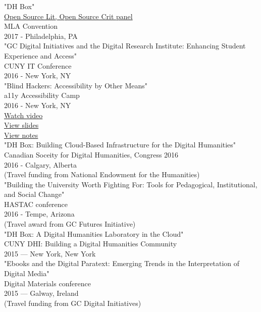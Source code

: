 \documentclass[11pt]{article}
\begin{document}
"DH Box"\\
\href{https://text.mla.hcommons.org/}{Open Source Lit, Open Source Crit panel}\\
MLA Convention\\
2017 - Philadelphia, PA\\

"GC Digital Initiatives and the Digital Research Institute: Enhancing Student Experience and Access"\\
CUNY IT Conference\\
2016 - New York, NY\\

"Blind Hackers: Accessibility by Other Means"\\
a11y Accessibility Camp\\
2016 - New York, NY\\
\href{https://www.youtube.com/watch?v=W8_O3joo4aU}{Watch video}\\
\href{http://htmlpreview.github.io/?https://github.com/smythp/blind-hackers/blob/master/presentation/foo.html}{View slides}\\
\href{https://github.com/smythp/blind-hackers}{View notes}\\

"DH Box: Building Cloud-Based Infrastructure for the Digital Humanities"\\
Canadian Soceity for Digital Humanities, Congress 2016\\
2016 - Calgary, Alberta\\
(Travel funding from National Endowment for the Humanities)\\

"Building the University Worth Fighting For: Tools for Pedagogical, Institutional, and Social Change"\\
HASTAC conference\\
2016 - Tempe, Arizona\\
(Travel award from GC Futures Initiative)\\

"DH Box: A Digital Humanities Laboratory in the Cloud"\\
CUNY DHI: Building a Digital Humanities Community\\
2015 — New York, New York\\

"Ebooks and the Digital Paratext: Emerging Trends in the Interpretation of Digital Media"\\
Digital Materials conference\\
2015 — Galway, Ireland\\
(Travel funding from GC Digital Initiatives)\\
\end{document}
